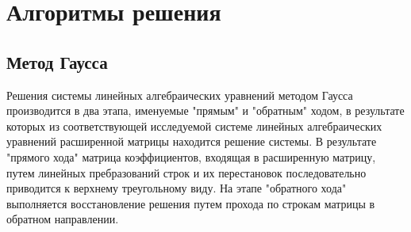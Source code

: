 \documentclass[12pt, a4paper]{report}
\begin{document}
\chapter{Алгоритмы решения}

\section{Метод Гаусса}
\normalsize{Решения системы линейных алгебраических уравнений методом Гаусса
            производится в два этапа, именуемые "прямым" и "обратным" ходом,
            в результате которых из соответствующей исследуемой системе линейных
            алгебраических уравнений расширенной матрицы находится решение системы.}
\normalsize{В результате "прямого хода" матрица коэффициентов, входящая в расширенную матрицу,
            путем линейных пребразований строк и их перестановок 
            последовательно приводится к верхнему треугольному виду.
            На этапе "обратного хода" выполняется восстановление решения путем
            прохода по строкам матрицы в обратном направлении.}
\end{document}
